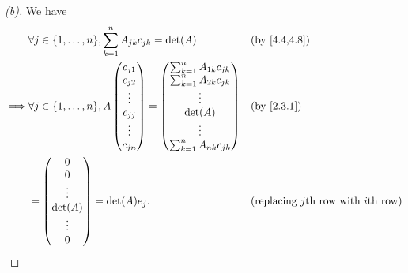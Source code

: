 \begin{proof}[(b)]
  We have
  \begin{align*}
             & \forall j \in \set{1, \dots, n}, \sum_{k = 1}^n A_{j k} c_{j k} = \det(A) &  & \text{(by \cref{4.4,4.8})}                        \\
    \implies & \forall j \in \set{1, \dots, n}, A \begin{pmatrix}
                                                    c_{j 1} \\
                                                    c_{j 2} \\
                                                    \vdots  \\
                                                    c_{j j} \\
                                                    \vdots  \\
                                                    c_{j n}
                                                  \end{pmatrix} = \begin{pmatrix}
                                                                    \sum_{k = 1}^n A_{1 k} c_{j k} \\
                                                                    \sum_{k = 1}^n A_{2 k} c_{j k} \\
                                                                    \vdots                         \\
                                                                    \det(A)                        \\
                                                                    \vdots                         \\
                                                                    \sum_{k = 1}^n A_{n k} c_{j k}
                                                                  \end{pmatrix}                        &  & \text{(by \cref{2.3.1})}            \\
             & = \begin{pmatrix}
                   0       \\
                   0       \\
                   \vdots  \\
                   \det(A) \\
                   \vdots  \\
                   0
                 \end{pmatrix} = \det(A) e_j.                                              &  & \text{(replacing \(j\)th row with \(i\)th row)}
  \end{align*}
\end{proof}

